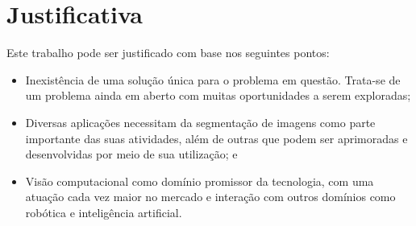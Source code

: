 \section{Justificativa}
Este trabalho pode ser justificado com base nos seguintes pontos:
\begin{itemize}
\item Inexistência de uma solução única para o problema em questão. Trata-se de um problema ainda em aberto com muitas oportunidades a serem exploradas;
\item Diversas aplicações necessitam da segmentação de imagens como parte importante das suas atividades, além de outras que podem ser aprimoradas e desenvolvidas por meio de sua utilização; e
\item Visão computacional como domínio promissor da tecnologia, com uma atuação cada vez maior no mercado e interação com outros domínios como robótica e inteligência artificial.
\end{itemize}






